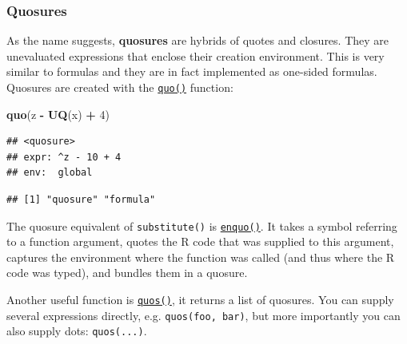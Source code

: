 \documentclass[]{book}
\newenvironment{Shaded}{\begin{snugshade}}{\end{snugshade}}
\newcommand{\DecValTok}[1]{\textcolor[rgb]{0.00,0.00,0.81}{#1}}
\newcommand{\KeywordTok}[1]{\textcolor[rgb]{0.13,0.29,0.53}{\textbf{#1}}}
\newcommand{\NormalTok}[1]{#1}
\newcommand{\OperatorTok}[1]{\textcolor[rgb]{0.81,0.36,0.00}{\textbf{#1}}}
\newcommand{\StringTok}[1]{\textcolor[rgb]{0.31,0.60,0.02}{#1}}
\begin{document}
\hypertarget{quosures}{%
\subsubsection{Quosures}\label{quosures}}

As the name suggests, \textbf{quosures} are hybrids of quotes and closures. They are
unevaluated expressions that enclose their creation environment. This is very similar to
formulas and they are in fact implemented as one-sided formulas. Quosures are created with
the \href{http://rlang.tidyverse.org/reference/quosure.html}{\texttt{quo()}} function:

\begin{Shaded}
\begin{Highlighting}[]
\KeywordTok{quo}\NormalTok{(z }\OperatorTok{-}\StringTok{ }\KeywordTok{UQ}\NormalTok{(x) }\OperatorTok{+}\StringTok{ }\DecValTok{4}\NormalTok{)}
\end{Highlighting}
\end{Shaded}

\begin{verbatim}
## <quosure>
## expr: ^z - 10 + 4
## env:  global
\end{verbatim}

\begin{Shaded}
\end{Shaded}

\begin{verbatim}
## [1] "quosure" "formula"
\end{verbatim}

The quosure equivalent of \texttt{substitute()} is
\href{http://rlang.tidyverse.org/reference/quosure.html}{\texttt{enquo()}}. It takes a symbol referring
to a function argument, quotes the R code that was supplied to this argument, captures the
environment where the function was called (and thus where the R code was typed), and
bundles them in a quosure.

Another useful function is \href{http://rlang.tidyverse.org/reference/quosure.html}{\texttt{quos()}}, it
returns a list of quosures. You can supply several expressions directly, e.g.
\texttt{quos(foo,\ bar)}, but more importantly you can also supply dots: \texttt{quos(...)}.
\end{document}
